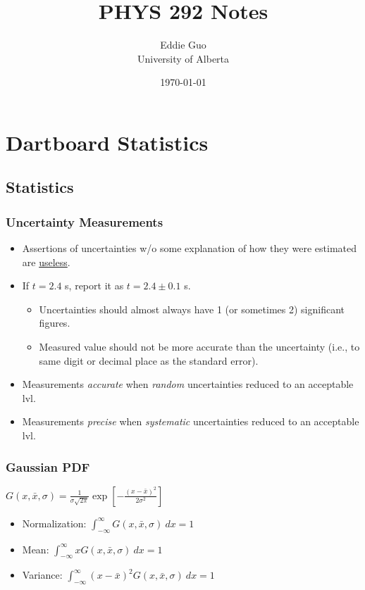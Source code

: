 \documentclass[twocolumn]{article}
\title{PHYS 292 Notes}
\author{Eddie Guo\\University of Alberta}
\date{\today}
\begin{document}
\maketitle

\section{Dartboard Statistics}
\subsection{Statistics}
\subsubsection{Uncertainty Measurements}
\begin{itemize}
    \item Assertions of uncertainties w/o some explanation of how they were estimated are \underline{useless}.
    \item If $t=2.4$ s, report it as $t = 2.4 \pm 0.1$ s.
    \begin{itemize}
        \item Uncertainties should almost always have 1 (or sometimes 2) significant figures.
        \item Measured value should not be more accurate than the uncertainty (i.e., to same digit or decimal place as the standard error).
    \end{itemize}
    \item Measurements \textit{accurate} when \textit{random} uncertainties reduced to an acceptable lvl.
    \item Measurements \textit{precise} when \textit{systematic} uncertainties reduced to an acceptable lvl.
\end{itemize}

\subsubsection{Gaussian PDF}
$\displaystyle G(x, \bar{x}, \sigma) = \frac{1}{\sigma \sqrt{2\pi}} \exp \left[ -\frac{(x-\bar{x})^2}{2 \sigma^2} \right]$
\begin{itemize}
    \item Normalization: $\displaystyle \int_{-\infty}^\infty G(x, \bar{x}, \sigma)\ dx = 1$
    \item Mean: $\displaystyle \int_{-\infty}^\infty x G(x, \bar{x}, \sigma)\ dx = 1$
    \item Variance: $\displaystyle \int_{-\infty}^\infty (x-\bar{x})^2 G(x, \bar{x}, \sigma)\ dx = 1$
\end{itemize}
\end{document}
